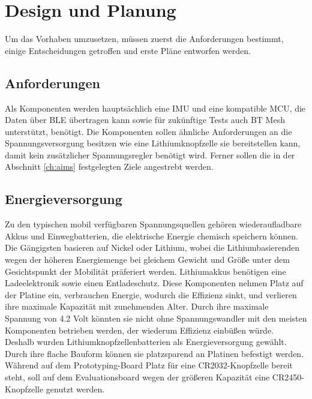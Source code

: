 \chapter{Design und Planung}
\label{ch:design}
Um das Vorhaben umzusetzen, müssen zuerst die Anforderungen bestimmt, einige Entscheidungen getroffen und erste Pläne entworfen werden.

\section{Anforderungen}
Als Komponenten werden hauptsächlich eine IMU und eine kompatible MCU, die Daten über BLE übertragen kann sowie für zukünftige Tests auch BT Mesh unterstützt, benötigt.
Die Komponenten sollen ähnliche Anforderungen an die Spannungsversorgung besitzen wie eine Lithiumknopfzelle sie bereitstellen kann, damit kein zusätzlicher Spannungsregler benötigt wird.
Ferner sollen die in der Abschnitt \ref{ch:aims} festgelegten Ziele angestrebt werden.

\section{Energieversorgung}
Zu den typischen mobil verfügbaren Spannungsquellen gehören wiederaufladbare Akkus und Einwegbatterien, die elektrische Energie chemisch speichern können.
Die Gängigsten basieren auf Nickel oder Lithium, wobei die Lithiumbasierenden wegen der höheren Energiemenge bei gleichem Gewicht und Größe unter dem Gesichtspunkt der Mobilität präferiert werden.
Lithiumakkus benötigen eine Ladeelektronik sowie einen Entladeschutz.
Diese Komponenten nehmen Platz auf der Platine ein, verbrauchen Energie, wodurch die Effizienz sinkt, und verlieren ihre maximale Kapazität mit zunehmenden Alter.
Durch ihre maximale Spannung von 4.2 Volt könnten sie nicht ohne Spannungswandler mit den meisten Komponenten betrieben werden, der wiederum Effizienz einbüßen würde. \cite{site_liion}\\
Deshalb wurden Lithiumknopfzellenbatterien als Energieversorgung gewählt.
Durch ihre flache Bauform können sie platzsparend an Platinen befestigt werden.
Während auf dem Prototyping-Board Platz für eine CR2032-Knopfzelle bereit steht, soll auf dem Evaluationsboard wegen der größeren Kapazität eine CR2450-Knopfzelle genutzt werden.

